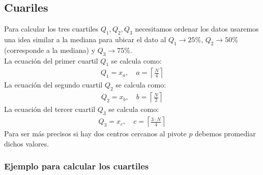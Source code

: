 \documentclass{article}
\begin{document}
\subsection{Cuariles}

Para calcular los tres cuartiles $Q_1, Q_2, Q_3$ necesitamos ordenar los datos usaremos una idea similar a la mediana para ubicar el dato al $Q_1 \rightarrow 25\%$, $Q_2 \rightarrow 50\%$ (corresponde a la mediana) y $Q_3 \rightarrow 75\%$.
\\[12pt]
La ecuación del primer cuartil $Q_1$ se calcula como:
\begin{equation}
    \begin{aligned}
        Q_1 = x_{a}, \quad a = \left \lceil \frac{N}{4} \right \rceil
    \end{aligned}
    \label{eq:q1}
\end{equation}
La ecuación del segundo cuartil $Q_2$ se calcula como:
\begin{equation}
    \begin{aligned}
        Q_2 = x_{b}, \quad b = \left \lceil \frac{N}{2} \right \rceil
    \end{aligned}
    \label{eq:q2}
\end{equation}
La ecuación del tercer cuartil $Q_3$ se calcula como:
\begin{equation}
    \begin{aligned}
        Q_3 = x_{c}, \quad c = \left \lceil \frac{3 \cdot N}{4} \right \rceil
    \end{aligned}
    \label{eq:q3}
\end{equation}
Para ser más precisos si hay dos centros cercanos al pivote $p$ debemos promediar dichos valores.

\subsubsection{Ejemplo para calcular los cuartiles}
\end{document}
